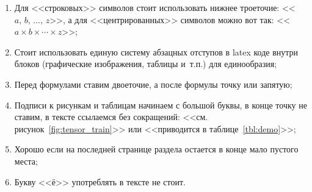 \begin{enumerate}
  \item
    Для <<строковых>> символов стоит использовать нижнее троеточие: <<$a, \, b, \, \ldots, \, z$>>, а для <<центрированных>> символов можно вот так: <<$a \times b \times \cdots \times z$>>;
  \item
    Стоит использовать единую систему абзацных отступов в latex коде внутри блоков (графические изображения, таблицы и~т.п.) для единообразия;
  \item
    Перед формулами ставим двоеточие, а после формулы точку или запятую;
  \item
    Подписи к рисункам и таблицам начинаем с большой буквы, в конце точку не ставим, в тексте ссылаемся без сокращений: <<см. рисунок~\ref{fig:tensor_train}>> или <<приводится в таблице~\ref{tbl:demo}>>;
  \item
    Хорошо если на последней странице раздела остается в конце мало пустого места;
  \item
    Букву <<ё>> употреблять в тексте не стоит.
\end{enumerate}
